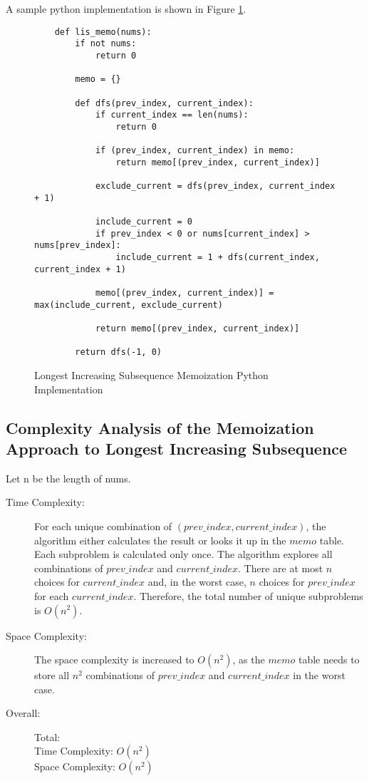 A sample python implementation is shown in Figure \ref{fig:lis-memo}.

\begin{figure}[H]
    \centering
    \begin{lstlisting}
    def lis_memo(nums):
        if not nums:
            return 0
    
        memo = {}
    
        def dfs(prev_index, current_index):
            if current_index == len(nums):
                return 0
    
            if (prev_index, current_index) in memo:
                return memo[(prev_index, current_index)]
            
            exclude_current = dfs(prev_index, current_index + 1)
    
            include_current = 0
            if prev_index < 0 or nums[current_index] > nums[prev_index]:
                include_current = 1 + dfs(current_index, current_index + 1)
    
            memo[(prev_index, current_index)] = max(include_current, exclude_current)
    
            return memo[(prev_index, current_index)]
    
        return dfs(-1, 0)
    \end{lstlisting}
    \caption{Longest Increasing Subsequence Memoization Python Implementation}
    \label{fig:lis-memo}
\end{figure}



\subsection{Complexity Analysis of the Memoization Approach to Longest Increasing Subsequence}
Let n be the length of nums.
\begin{description}
    \item[Time Complexity:]
        For each unique combination of $(prev\_index, current\_index)$, the algorithm either calculates the result or looks it up in the $memo$ table.
        Each subproblem is calculated only once.
        The algorithm explores all combinations of $prev\_index$ and $current\_index$.
        There are at most $n$ choices for $current\_index$ and,
        in the worst case, $n$ choices for $prev\_index$ for each $current\_index$.
        Therefore, the total number of unique subproblems is $O(n^2)$.
        
    \item[Space Complexity:] 
        The space complexity is increased to $O(n^2)$,
        as the $memo$ table needs to store all $n^2$ combinations of $prev\_index$ and $current\_index$ in the worst case.
        
        
    \item[Overall:] Total:\\
        Time Complexity: $O(n^2)$\\
        Space Complexity: $O(n^2)$
    
\end{description}

